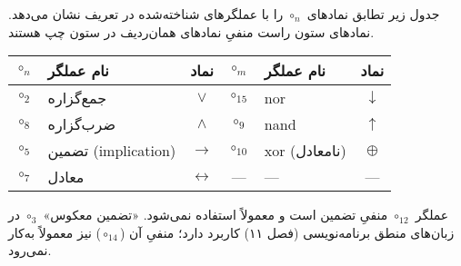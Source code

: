      جدول زیر تطابق نمادهای $\circ_n$ را با عملگرهای شناخته‌شده در تعریف  نشان می‌دهد. نمادهای ستون راست منفیِ نمادهای همان‌ردیف در ستون چپ هستند.
      \begin{center}
      \begin{tabular}{|c|l|c||c|l|c|}
      \hline
      $\circ_n$ & نام عملگر           & نماد              & $\circ_m$  & نام عملگر     & نماد         \\\hline
      $\circ_2$ & جمع‌گزاره           & $\lor$            & $\circ_{15}$ & nor           & $\downarrow$ \\\hline
      $\circ_8$ & ضرب‌گزاره           & $\land$           & $\circ_{9}$  & nand          & $\uparrow$   \\\hline
      $\circ_5$ & تضمین (implication) & $\to$             & $\circ_{10}$ & xor (نامعادل) & $\oplus$     \\\hline
      $\circ_7$ & معادل               & $\leftrightarrow$ & —           & —             & —            \\\hline
      \end{tabular}
      \end{center}
      عملگر $\circ_{12}$ منفیِ تضمین است و معمولاً استفاده نمی‌شود. «تضمین معکوس» $\circ_3$ در زبان‌های منطق برنامه‌نویسی (فصل ۱۱) کاربرد دارد؛ منفیِ آن ($\circ_{14}$) نیز معمولاً به‌کار نمی‌رود.